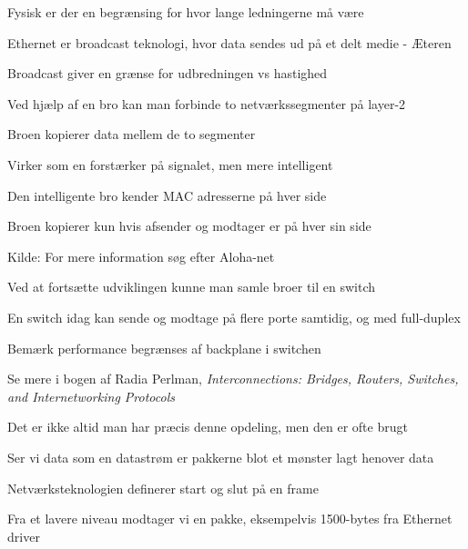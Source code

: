 \documentclass[Screen16to9,17pt]{foils}
\begin{document}
\centerline{Fysisk er der en begrænsing for hvor lange ledningerne må være}


\begin{list1}
\item Ethernet er broadcast teknologi, hvor data sendes ud på et delt medie - Æteren
\item Broadcast giver en grænse for udbredningen vs hastighed
\item Ved hjælp af en bro kan man forbinde to netværkssegmenter på layer-2
\item Broen kopierer data mellem de to segmenter
\item Virker som en forstærker på signalet, men mere intelligent
\item Den intelligente bro kender MAC adresserne på hver side
\item Broen kopierer kun hvis afsender og modtager er på hver sin side
\end{list1}

Kilde: For mere information søg efter Aloha-net\\ 



\begin{list1}
\item Ved at fortsætte udviklingen kunne man samle broer til en switch
\item En switch idag kan sende og modtage på flere porte samtidig, og med full-duplex
\item Bemærk performance begrænses af backplane i switchen
\end{list1}



Se mere i bogen af Radia Perlman, \emph{Interconnections: Bridges, Routers, Switches, and Internetworking Protocols}



\centerline{Det er ikke altid man har præcis denne opdeling, men den er ofte brugt}


\begin{list1}
\item Ser vi data som en datastrøm er pakkerne blot et mønster lagt henover data
\item Netværksteknologien definerer start og slut på en frame
\item Fra et lavere niveau modtager vi en pakke, eksempelvis 1500-bytes fra Ethernet driver
\end{list1}
\end{document}
